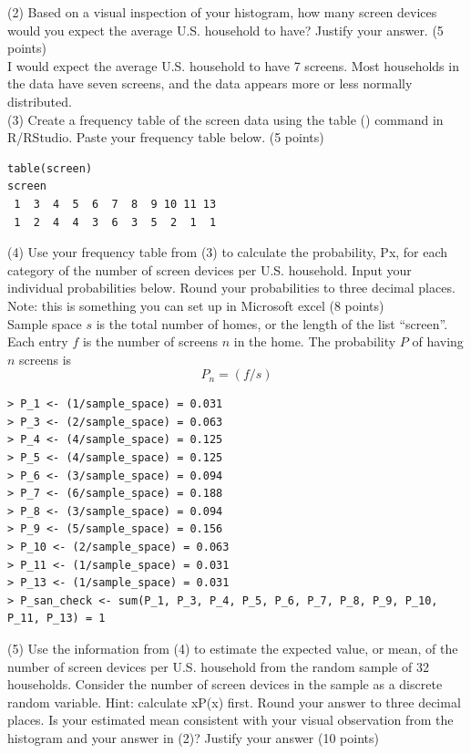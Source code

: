 \documentclass{article}
\begin{document}
(2) Based on a visual inspection of your histogram, how many screen devices would you expect the average U.S. household to have? Justify your answer. (5 points) \\

I would expect the average U.S. household to have 7 screens. Most households in the data have seven screens, and the data appears more or less normally distributed. \\

(3) Create a frequency table of the screen data using the table () command in R/RStudio. Paste your frequency table below. (5 points)

\begin{center}
\begin{lstlisting}
table(screen)
screen
 1  3  4  5  6  7  8  9 10 11 13 
 1  2  4  4  3  6  3  5  2  1  1 
\end{lstlisting}
\end{center}
(4) Use your frequency table from (3) to calculate the probability, Px, for each category of the number of screen devices per U.S. household. Input your individual probabilities below. Round your probabilities to three decimal places. Note: this is something you can set up in Microsoft excel (8 points)\\

Sample space $s$ is the total number of homes, or the length of the list ``screen''. Each entry $f$ is the number of screens $n$ in the home. The probability $P$ of having $n$ screens is 
\[
P_n = (f / s)
\]
\begin{center}
\begin{lstlisting}
> P_1 <- (1/sample_space) = 0.031
> P_3 <- (2/sample_space) = 0.063
> P_4 <- (4/sample_space) = 0.125
> P_5 <- (4/sample_space) = 0.125
> P_6 <- (3/sample_space) = 0.094
> P_7 <- (6/sample_space) = 0.188
> P_8 <- (3/sample_space) = 0.094
> P_9 <- (5/sample_space) = 0.156
> P_10 <- (2/sample_space) = 0.063
> P_11 <- (1/sample_space) = 0.031
> P_13 <- (1/sample_space) = 0.031
> P_san_check <- sum(P_1, P_3, P_4, P_5, P_6, P_7, P_8, P_9, P_10, P_11, P_13) = 1
\end{lstlisting}
\end{center}



(5) Use the information from (4) to estimate the expected value, or mean, of the number of screen devices per U.S. household from the random sample of 32 households. Consider the number of screen devices in the sample as a discrete random variable. Hint: calculate xP(x) first. Round your answer to three decimal places. Is your estimated mean consistent with your visual observation from the histogram and your answer in (2)? Justify your answer (10 points)\\
\end{document}
